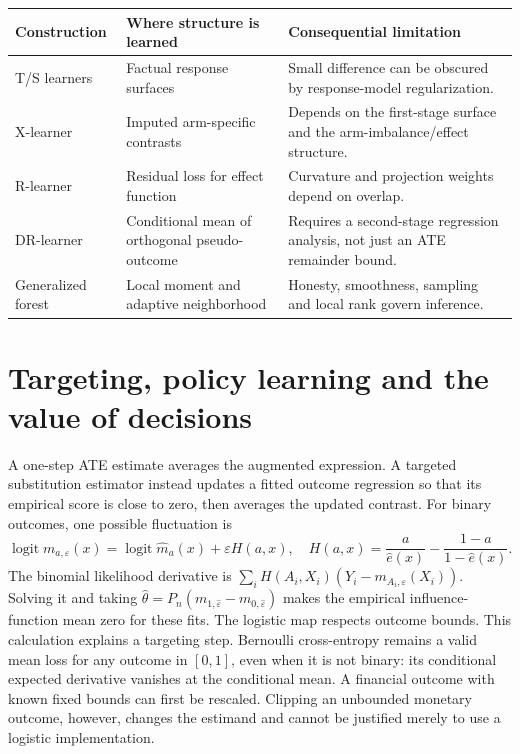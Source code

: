 \begin{center}\small
\begin{tabularx}{\textwidth}{P{23mm}XX}
\toprule
Construction & Where structure is learned & Consequential limitation\\
\midrule
T/S learners & Factual response surfaces & Small difference can be
obscured by response-model regularization.\\
X-learner & Imputed arm-specific contrasts & Depends on the first-stage
surface and the arm-imbalance/effect structure.\\
R-learner & Residual loss for effect function & Curvature and projection
weights depend on overlap.\\
DR-learner & Conditional mean of orthogonal pseudo-outcome & Requires a
second-stage regression analysis, not just an ATE remainder bound.\\
Generalized forest & Local moment and adaptive neighborhood & Honesty,
smoothness, sampling and local rank govern inference.\\
\bottomrule
\end{tabularx}
\end{center}

\section{Targeting, policy learning and the value of decisions}
\label{r3:targeting}
A one-step ATE estimate averages the augmented expression. A targeted
substitution estimator instead updates a fitted outcome regression so
that its empirical score is close to zero, then averages the updated
contrast. For binary outcomes, one possible fluctuation is
\[
 \operatorname{logit}m_{a,\varepsilon}(x)
 =\operatorname{logit}\widehat m_a(x)+\varepsilon H(a,x),\quad
 H(a,x)=\frac a{\widehat e(x)}-\frac{1-a}{1-\widehat e(x)}.
\]
The binomial likelihood derivative is
$\sum_iH(A_i,X_i)(Y_i-m_{A_i,\varepsilon}(X_i))$.
Solving it and taking
$\widehat\theta=P_n(m_{1,\widehat\varepsilon}-m_{0,\widehat\varepsilon})$
makes the empirical influence-function mean zero for these fits. The
logistic map respects outcome bounds. This calculation explains a
targeting step. Bernoulli cross-entropy remains a valid mean loss for
any outcome in $[0,1]$, even when it is not binary: its conditional
expected derivative vanishes at the conditional mean. A financial
outcome with known fixed bounds can first be rescaled. Clipping an
unbounded monetary outcome, however, changes the estimand and cannot
be justified merely to use a logistic implementation.

